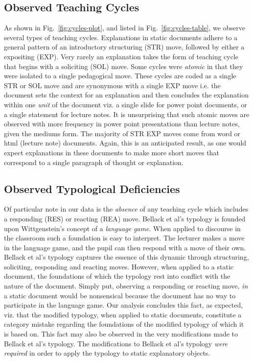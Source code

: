 \documentclass[conference]{IEEEtran}
\begin{document}
\subsection{Observed Teaching Cycles}
As shown in Fig.~\ref{fig:cycles-plot}, and listed in
Fig.~\ref{fig:cycles-table}, we observe several types of teaching cycles.
Explanations in static documents adhere to a general pattern of an introductory
structuring (STR) move, followed by either a expositing (EXP). Very rarely an
explanation takes the form of teaching cycle that begins with a soliciting (SOL)
move. Some cycles were \emph{atomic} in that they were isolated to a single
pedagogical move. These cycles are coded as a single STR or SOL move and are
synonymous with a single EXP move i.e. the document sets the context for an
explanation and then concludes the explanation within one \emph{unit} of the
document viz. a single slide for power point documents, or a single statement
for lecture notes. It is unsurprising that such atomic moves are observed with
more frequency in power point presentations than lecture notes, given the
mediums form. The majority of STR EXP moves come from word or html (lecture
note) documents. Again, this is an anticipated result, as one would expect
explanations in these documents to make more short moves that correspond to a
single paragraph of thought or explanation.

\subsection{Observed Typological Deficiencies}
Of particular note in our data is the \emph{absence} of any teaching cycle which
includes a responding (RES) or reacting (REA) move. Bellack et al's typology is
founded upon Wittgenstein's concept of a \emph{language game}. When applied to
discourse in the classroom such a foundation is easy to interpret. The lecturer
makes a move in the language game, and the pupil can then respond with a move of
their own. Bellack et al's typology captures the essence of this dynamic through
structuring, soliciting, responding and reacting moves. However, when applied to
a static document, the foundations of which the typology rest into conflict with
the nature of the document. Simply put, observing a responding or reacting move,
\emph{in} a static document would be nonsensical because the document has no way
to participate in the language game. Our analysis concludes this fact, as
expected, viz. that the modified typology, when applied to static documents,
constitute a category mistake regarding the foundations of the modified typology
of which it is based on. This fact may also be observed in the very
modifications made to Bellack et al's typology. The modifications to Bellack et
al's typology \emph{were required} in order to apply the typology to static
explanatory objects.
\end{document}
